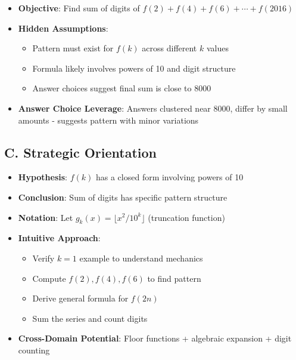 \documentclass[]{article}
\begin{document}
\begin{problemconfigbox}
\begin{itemize}[leftmargin=*]
    \item \textbf{Objective}: Find sum of digits of $f(2) + f(4) + f(6) + \cdots + f(2016)$
    
    \item \textbf{Hidden Assumptions}: 
    \begin{itemize}
        \item Pattern must exist for $f(k)$ across different $k$ values
        \item Formula likely involves powers of 10 and digit structure
        \item Answer choices suggest final sum is close to 8000
    \end{itemize}
    
    \item \textbf{Answer Choice Leverage}: Answers clustered near 8000, differ by small amounts - suggests pattern with minor variations
\end{itemize}

\subsection*{C. Strategic Orientation}
\begin{itemize}[leftmargin=*]
    \item \textbf{Hypothesis}: $f(k)$ has a closed form involving powers of 10
    \item \textbf{Conclusion}: Sum of digits has specific pattern structure
    \item \textbf{Notation}: Let $g_k(x) = \lfloor x^2/10^k \rfloor$ (truncation function)
    \item \textbf{Intuitive Approach}: 
    \begin{itemize}
        \item Verify $k=1$ example to understand mechanics
        \item Compute $f(2), f(4), f(6)$ to find pattern
        \item Derive general formula for $f(2n)$
        \item Sum the series and count digits
    \end{itemize}
    \item \textbf{Cross-Domain Potential}: Floor functions + algebraic expansion + digit counting
\end{itemize}
\end{problemconfigbox}
\end{document}
